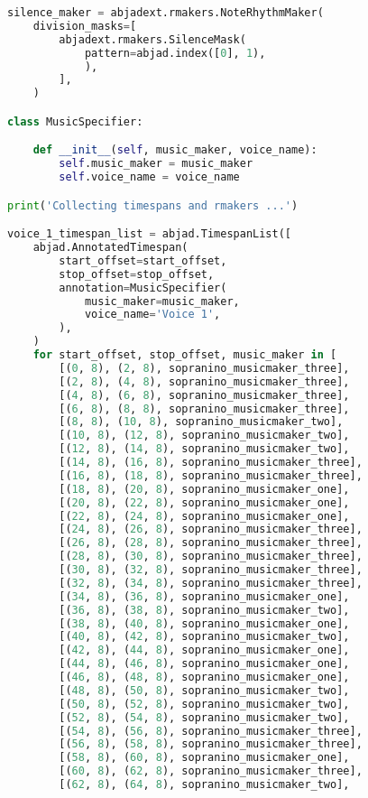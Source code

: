 \begin{lstlisting}[language=Python, caption=Invocation Source Code]
silence_maker = abjadext.rmakers.NoteRhythmMaker(
    division_masks=[
        abjadext.rmakers.SilenceMask(
            pattern=abjad.index([0], 1),
            ),
        ],
    )

class MusicSpecifier:

    def __init__(self, music_maker, voice_name):
        self.music_maker = music_maker
        self.voice_name = voice_name

print('Collecting timespans and rmakers ...')

voice_1_timespan_list = abjad.TimespanList([
    abjad.AnnotatedTimespan(
        start_offset=start_offset,
        stop_offset=stop_offset,
        annotation=MusicSpecifier(
            music_maker=music_maker,
            voice_name='Voice 1',
        ),
    )
    for start_offset, stop_offset, music_maker in [
        [(0, 8), (2, 8), sopranino_musicmaker_three],
        [(2, 8), (4, 8), sopranino_musicmaker_three],
        [(4, 8), (6, 8), sopranino_musicmaker_three],
        [(6, 8), (8, 8), sopranino_musicmaker_three],
        [(8, 8), (10, 8), sopranino_musicmaker_two],
        [(10, 8), (12, 8), sopranino_musicmaker_two],
        [(12, 8), (14, 8), sopranino_musicmaker_two],
        [(14, 8), (16, 8), sopranino_musicmaker_three],
        [(16, 8), (18, 8), sopranino_musicmaker_three],
        [(18, 8), (20, 8), sopranino_musicmaker_one],
        [(20, 8), (22, 8), sopranino_musicmaker_one],
        [(22, 8), (24, 8), sopranino_musicmaker_one],
        [(24, 8), (26, 8), sopranino_musicmaker_three],
        [(26, 8), (28, 8), sopranino_musicmaker_three],
        [(28, 8), (30, 8), sopranino_musicmaker_three],
        [(30, 8), (32, 8), sopranino_musicmaker_three],
        [(32, 8), (34, 8), sopranino_musicmaker_three],
        [(34, 8), (36, 8), sopranino_musicmaker_one],
        [(36, 8), (38, 8), sopranino_musicmaker_two],
        [(38, 8), (40, 8), sopranino_musicmaker_one],
        [(40, 8), (42, 8), sopranino_musicmaker_two],
        [(42, 8), (44, 8), sopranino_musicmaker_one],
        [(44, 8), (46, 8), sopranino_musicmaker_one],
        [(46, 8), (48, 8), sopranino_musicmaker_one],
        [(48, 8), (50, 8), sopranino_musicmaker_two],
        [(50, 8), (52, 8), sopranino_musicmaker_two],
        [(52, 8), (54, 8), sopranino_musicmaker_two],
        [(54, 8), (56, 8), sopranino_musicmaker_three],
        [(56, 8), (58, 8), sopranino_musicmaker_three],
        [(58, 8), (60, 8), sopranino_musicmaker_one],
        [(60, 8), (62, 8), sopranino_musicmaker_three],
        [(62, 8), (64, 8), sopranino_musicmaker_two],

\end{lstlisting}
